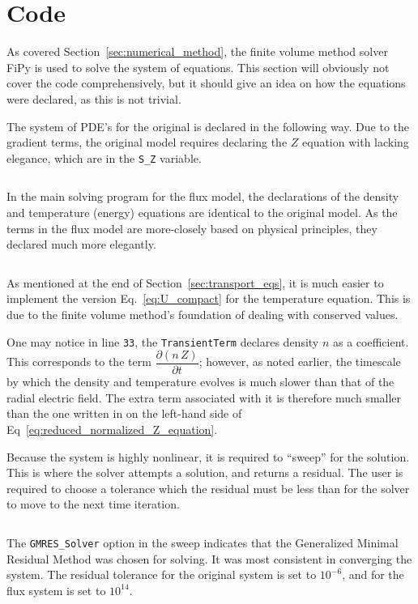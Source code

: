 \chapter{Code}\label{chapter:Code}
As covered Section~\ref{sec:numerical_method}, the finite volume method solver FiPy \cite{guyer_fipy:_2009} is used to solve the system of equations.
This section will obviously not cover the code comprehensively, but it should give an idea on how the equations were declared, as this is not trivial.

The system of PDE's for the original is declared in the following way.
Due to the gradient terms, the original model requires declaring the $Z$ equation with lacking elegance, which are in the \texttt{S_Z} variable.
\inputminted[firstline=19, lastline=38, tabsize=4, breaklines=true, fontsize=\footnotesize, frame=single, linenos=true]{python}{../FiPy_Model/solving_original.py}

In the main solving program for the flux model, the declarations of the density and temperature (energy) equations are identical to the original model.
As the terms in the flux model are more-closely based on physical principles, they declared much more elegantly.
\inputminted[firstline=32, lastline=39, tabsize=4, breaklines=true, fontsize=\footnotesize, frame=single, linenos=true]{python}{../FiPy_Model/solving_flux.py}
As mentioned at the end of Section~\ref{sec:transport_eqs}, it is much easier to implement the version Eq.~\ref{eq:U_compact} for the temperature equation.
This is due to the finite volume method's foundation of dealing with conserved values.

One may notice in line \texttt{33}, the \texttt{TransientTerm} declares density $n$ as a coefficient.
This corresponds to the term $\dfrac{\partial (n \, Z)}{\partial t}$; however, as noted earlier, the timescale by which the density and temperature evolves is much slower than that of the radial electric field.
The extra term associated with it is therefore much smaller than the one written in on the left-hand side of Eq~\ref{eq:reduced_normalized_Z_equation}.

Because the system is highly nonlinear, it is required to ``sweep'' for the solution.
This is where the solver attempts a solution, and returns a residual.
The user is required to choose a tolerance which the residual must be less than for the solver to move to the next time iteration.
\inputminted[firstline=98, lastline=113, tabsize=4, breaklines=true, fontsize=\footnotesize, frame=single, linenos=true]{python}{../FiPy_Model/solving_flux.py}

The \texttt{GMRES_Solver} option in the sweep indicates that the Generalized Minimal Residual Method was chosen for solving.
It was most consistent in converging the system.
The residual tolerance for the original system is set to $10^{-6}$, and for the flux system is set to $10^{14}$.

